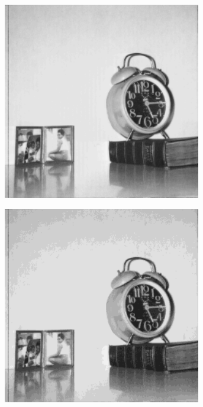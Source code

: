 \begin{figure}
\begin{subfigure}[b]{.23\textwidth}
  \caption{}
  \label{fig:test-images-clock}
\end{subfigure}
\begin{subfigure}[b]{.23\textwidth}
  \centering
  \includegraphics[width=0.95\textwidth]{figures/test-images/truncate2/clock}
  \caption{}
  \label{fig:test-images-clock}
\end{subfigure}
\begin{subfigure}[b]{.23\textwidth}
  \centering
  \includegraphics[width=0.95\textwidth]{figures/test-images/truncate4/clock}
  \caption{}
  \label{fig:test-images-clock}
\end{subfigure}


\end{figure}
